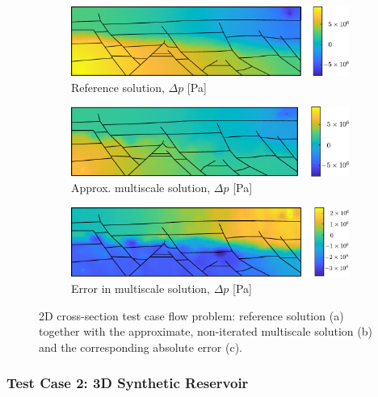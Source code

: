 \begin{figure} [htbp]
    \begin{subfigure}{0.48\textwidth}
        \includegraphics[width=\linewidth]{figs/CrossSection/flow_sol}
	    \caption{Reference solution, $\Delta p$ [Pa]}
        \label{fig:cross_section_flow_sol_full}
    \end{subfigure}
    \hfill
    \begin{subfigure}{0.48\textwidth}
        \includegraphics[width=\linewidth]{figs/CrossSection/flow_sol_approx}
	    \caption{Approx. multiscale solution, $\Delta p$ [Pa]}
        \label{fig:cross_section_flow_sol_approx}
    \end{subfigure}
    \par\bigskip
    \begin{subfigure}{0.48\textwidth}
        \includegraphics[width=\linewidth]{figs/CrossSection/flow_sol_error}
	    \caption{Error in multiscale solution, $\Delta p$ [Pa]}
        \label{fig:cross_section_flow_sol_error}
    \end{subfigure}
    \caption[2D cross-section test case flow solutions]{2D cross-section test case flow problem: reference solution (a) together with the approximate, non-iterated multiscale solution (b) and the corresponding absolute error (c).}
    \label{fig:cross_section_flow_sol}
\end{figure}

\subsubsection{Test Case 2: 3D Synthetic Reservoir}

